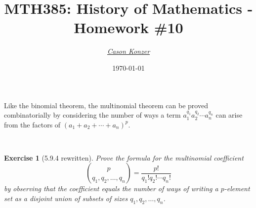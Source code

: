 \documentclass[12pt]{article}
\newcommand{\XB}{\color{black}}
\newcommand{\XBB}{\color{blue}}
\newcommand{\XV}{\color{violet}}
\theoremstyle{plain}
\newtheorem{ex}{Exercise}
\begin{document}
\title{\textbf{MTH385}: History of Mathematics - Homework \#10}
\date{\today}
\author{\XV\textit{\large{\href{https://github.com/casonk}{Cason Konzer}}}\XB}

\maketitle

\hrulefill

\newpage

Like the binomial theorem, 
the multinomial theorem can be proved combinatorially by considering the number of ways a term 
$ a_{1}^{q_{1}} a_{2}^{q_{2} }\cdots a_{n}^{q_{n}} $ 
can arise from the factors of $ ( a_{1} + a_{2} + \cdots + a_{n})^{p} $.


\XBB\hrulefill\XB \\
\begin{ex} [5.9.4 rewritten]
  Prove the formula for the multinomial coefficient
  \[
    \binom{p}{q_{1}, q_{2}, \ldots, q_{n}} = \frac{p!}{q_{1}!q_{2}! \cdots q_{n}!}
  \]
  by observing that the coefficient equals the number of ways of writing a 
  $ p $-element set as a disjoint union of subsets of sizes $ q_{1}, q_{2}, \ldots, q_{n} $.
\end{ex}
\XBB\hrulefill\XB \\
\end{document}
